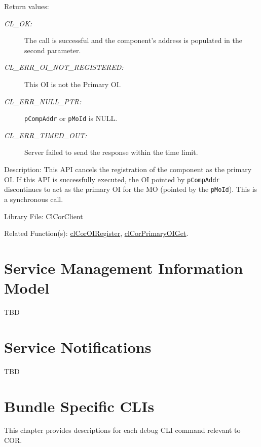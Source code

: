\begin{flushleft}
\begin{Desc}
\begin{description}
\end{description}
\end{Desc}
\begin{Desc}
\item[Return values:]
\begin{description}

\item[{\em CL\_\-OK:}] The call is successful and the component's address is populated in the second parameter.
 \item[{\em CL\_\-ERR\_\-OI\_\-NOT\_\-REGISTERED:}] This OI is not the Primary OI.
 \item[{\em CL\_\-ERR\_\-NULL\_\-PTR:}] {\tt{pCompAddr}} or {\tt{pMoId}} is NULL.
\item[{\em CL\_\-ERR\_\-TIMED\_\-OUT:}] Server failed to send the response within the time limit. 
 

 \end{description}
\end{Desc}
\begin{Desc}
\item[Description:]
This API cancels the registration of the component as the primary OI. 
If this API is successfully executed, the OI pointed by {\tt{pCompAddr}} discontinues to act as the primary OI for the MO (pointed by the {\tt{pMoId}}).
This is a synchronous call.

\end{Desc}
\begin{Desc}
\item[Library File:]Cl\-Cor\-Client\end{Desc}
\begin{Desc}
\item[Related Function(s):]\hyperlink{pagecor135}{clCorOIRegister}, \hyperlink{pagecor138}{clCorPrimaryOIGet}.

\end{Desc}

\chapter{Service Management Information Model}
TBD


\chapter{Service Notifications}
TBD



\chapter{Bundle Specific CLIs}
This chapter provides descriptions for each debug CLI command relevant to COR.



\end{flushleft}
